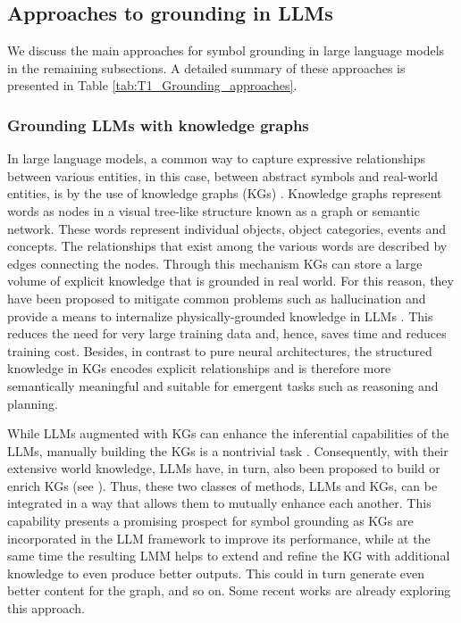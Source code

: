 \documentclass[10pt,journal,compsoc]{IEEEtran}
\begin{document}
		
	
	
	
	\subsection{Approaches to grounding in LLMs}
	We discuss the main approaches for symbol grounding in large language models in the remaining subsections. A detailed summary of these approaches is presented in Table \ref{tab:T1_Grounding_approaches}.
	
	\subsubsection{Grounding LLMs with knowledge graphs}
	In large language models, a common way to capture expressive relationships between various entities, in this case, between abstract symbols and real-world entities, is by the use of knowledge graphs (KGs) \cite{chen2020review,fensel2020introduction,wang2017knowledge}. Knowledge graphs represent words as nodes in a visual tree-like structure known as a graph or semantic network. These words represent individual objects, object categories, events and concepts. The relationships that exist among the various words are described by edges connecting the nodes.  Through this mechanism KGs can store a large volume of explicit knowledge that is grounded in real world. For this reason, they have been proposed to mitigate common problems such as hallucination and provide a means to internalize physically-grounded knowledge in LLMs \cite{rosset2020knowledge,liu2020k,sun2019ernie,pan2024unifying}. This reduces the need for very large training data and, hence, saves time and reduces training cost. Besides, in contrast to pure neural architectures, the structured knowledge in KGs encodes explicit relationships and is therefore more semantically meaningful and suitable for emergent tasks such as reasoning and planning.
	
	
	While LLMs augmented with KGs can enhance the inferential capabilities of the LLMs, manually building the KGs is a nontrivial task \cite{zhou2020survey}. Consequently, with their extensive world knowledge, LLMs have, in turn, also been proposed to build or enrich KGs (see \cite{zhang2024extract,zhang2020pretrain, abu2024knowledge,pan2023large}). Thus, these two classes of methods, LLMs and KGs, can be integrated in a way that allows them to mutually enhance each another. This capability presents a promising prospect  for symbol grounding as KGs are incorporated in the LLM framework to improve its performance, while at the same time the resulting LMM helps to extend and refine the KG with additional knowledge to even produce better outputs. This could in turn generate even better content for the graph, and so on. Some recent works \cite{xu2024llm,wang2021kepler,khorashadizadeh2024research}
	are already exploring this approach. 
	
\end{document}
